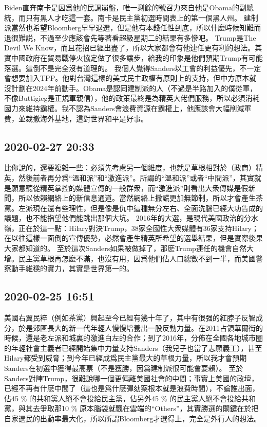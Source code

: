 \documentclass[twocolumn]{ctexart}
\begin{document}
Biden直奔南卡是因爲他的民調崩盤，唯一剩餘的號召力來自他是Obama的副總統，而只有黑人才吃這一套。南卡是民主黨初選時間表上的第一個黑人州。
建制派當然也希望Bloomberg早早退選，但是他有本錢任性到底，所以什麽時候知難而退很難説，不過至少應該會先等著看超級星期二的結果有多慘吧。
Trump是The Devil We Know，而且花招已經出盡了，所以大家都會有他連任更有利的想法。其實中國政府在貿易戰停火協定做了很多讓步，給我的印象是他們預期Trump有可能落選。這倒不是完全沒有道理的。
我個人覺得Sanders以工會的利益優先，不一定會想要加入TPP。他對台灣這樣的美式民主政權有原則上的支持，但中方原本就沒計劃在2024年前動手。Obama是認同建制派的人（不過是半路加入的僕從軍，不像Buttigieg是正規軍親信），他的政策最終是為精英大佬們服務，所以必須消耗國力來維持霸權。我不認為Sanders會浪費資源在霸權上，他應該會大幅削減軍費，並裁撤海外基地，這對世界和平是好事。
\subsection*{2020-02-27 20:33}

比你說的，還要複雜一些：必須先考慮另一個維度，也就是草根相對於（政商）精英，然後前者再分爲“溫和派”和“激進派”。所謂的“溫和派”或者“中間派”，其實就是願意聽從精英掌控的媒體宣傳的一般群衆，而“激進派”則看出大衆傳媒是假新聞，所以依賴網絡上的新信息通道。當然網絡上撒謊更加無節制，所以才會產生茶黨。左派現在還有些理性，但是像是仇中這種無分左右、全面洗腦已經大功告成的議題，也不能指望他們能跳出那個大坑。
2016年的大選，是現代美國政治的分水嶺，正在於這一點：Hilary對決Trump，38家全國性大衆媒體有36家支持Hilary；在以往這樣一面倒的宣傳優勢，必然會產生精英所希望的選舉結果，但是實際後果大家都知道的。
至於這次Sanders如果被做掉了，那麽Trump連任的機會自然大增。民主黨草根再怎麽不滿，也沒有用，因爲他們佔人口總數不到一半，而美國警察動手維穩的實力，其實是世界第一的。
\subsection*{2020-02-25 16:51}

美國右翼民粹（例如茶黨）興起至今已經有幾十年了，其中有很强的紅脖子反智成分，於是郊區長大的新一代年輕人慢慢培養出一股反動力量。在2011占領華爾街的時候，還是老左派和城裏的激進白左的合作；到了2016年，分佈在全國各地城市圈的年輕社會主義者已經開始集中力量支持Sanders（我兒子也當了志願義工），甚至Hilary都受到威脅；到今年已經成爲民主黨最大的草根力量，所以我才會預期Sanders在初選中獲得最高票（不是獲勝，因爲建制派很可能會耍賴）。
至於Sanders對陣Trump，很難說哪一個更偏離美國社會的中間；事實上美國的政壇，已經不再有什麽中間了（這也是爲什麽彈劾案根本就是浪費時間），不論誰出面，佔45 \% 的共和黨人絕不會投給民主黨，佔另外45 \% 的民主黨人絕不會投給共和黨，與其去爭取那10 \% 原本腦袋就飄在雲端的“Others”，其實勝選的關鍵在於把自家選民的出動率最大化，所以所謂Bloomberg才選得上，完全是外行人的想法。
\end{document}

